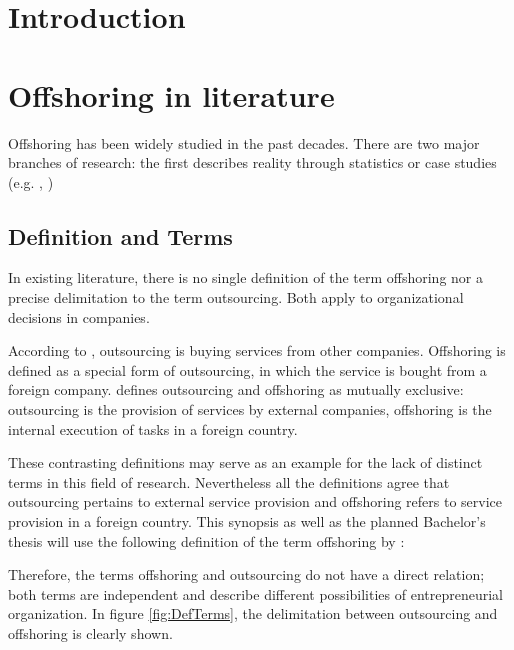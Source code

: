 \documentclass[  12pt,
titlepage,
parskip,
draft=false,
headsepline=true,
footsepline=true,
captions=tableheading]{scrartcl}
\newcommand{\firstpages}{
	
	
	\newpage
	\tableofcontents{}
	\addtocontents{toc}{~\hfill\textbf{Page}\par}
	
	\newpage
	\listoffigures
	
	\newpage
	\listoftables
	\newpage
}
\begin{document}
\firstpages

\section{Introduction}

\newpage
\section{Offshoring in literature}
Offshoring has been widely studied in the past decades. There are two major branches of research: the first describes reality through statistics or case studies (e.g. \cite{Rottman.2008}, \cite{Pedersen.2013} )

\subsection{Definition and Terms}
In existing literature, there is no single definition of the term offshoring nor a precise delimitation to the term outsourcing. Both apply to organizational decisions in companies. 

According to \cite[pp. 1f]{Specht.2007}, outsourcing is buying services from other companies. Offshoring is defined as a special form of outsourcing, in which the service is bought from a foreign company. \cite[p. 2]{Alebrand.2013} defines outsourcing and offshoring as mutually exclusive: outsourcing is the provision of services by external companies, offshoring is the internal execution of tasks in a foreign country.

These contrasting definitions may serve as an example for the lack of distinct terms in this field of research. Nevertheless all the definitions agree that outsourcing pertains to external service provision and offshoring refers to service provision in a foreign country. This synopsis as well as the planned Bachelor's thesis will use the following definition of the term offshoring by \cite[p. 321]{Andersson.2016}:


Therefore, the terms offshoring and outsourcing do not have a direct relation; both terms are independent and describe different possibilities of entrepreneurial organization. In figure \ref{fig:DefTerms}, the delimitation between outsourcing and offshoring is clearly shown.
\end{document}

